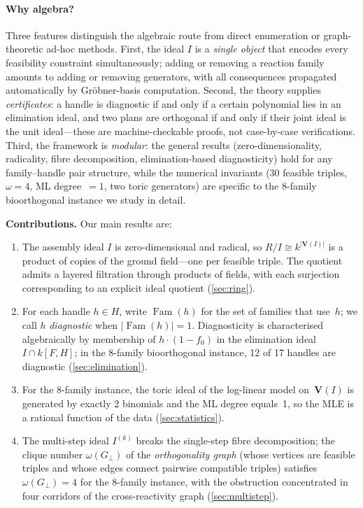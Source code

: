 \documentclass[preprint,12pt]{elsarticle}
\theoremstyle{definition}
\theoremstyle{remark}
\newcommand{\kk}{k}
\newcommand{\Var}{\mathbf{V}}
\DeclareMathOperator{\Fam}{Fam}
\begin{document}
\paragraph{Why algebra?}
Three features distinguish the algebraic route from direct
enumeration or graph-theoretic ad-hoc methods.
First, the ideal $I$ is a \emph{single object} that encodes every
feasibility constraint simultaneously; adding or removing a reaction
family amounts to adding or removing generators, with all consequences
propagated automatically by Gr\"obner-basis computation.
Second, the theory supplies \emph{certificates}: a handle is
diagnostic if and only if a certain polynomial lies in an elimination
ideal, and two plans are orthogonal if and only if their joint
ideal is the unit ideal---these are machine-checkable proofs, not
case-by-case verifications.
Third, the framework is \emph{modular}: the general results
(zero-dimensionality, radicality, fibre decomposition,
elimination-based diagnosticity) hold for any family--handle pair
structure, while the numerical invariants (30 feasible triples,
$\omega = 4$, ML degree~$= 1$, two toric generators) are specific
to the 8-family bioorthogonal instance we study in detail.

\medskip
\noindent\textbf{Contributions.}
Our main results are:

\begin{enumerate}[label=(\roman*),nosep]
\item The assembly ideal $I$ is zero-dimensional and radical, so
  $R/I \cong \kk^{|\Var(I)|}$ is a product of copies of the ground
  field---one per feasible triple.  The quotient admits a layered
  filtration through products of fields, with each surjection
  corresponding to an explicit ideal quotient (\cref{sec:ring}).
\item For each handle $h \in H$, write $\Fam(h)$ for the set of
  families that use~$h$; we call $h$ \emph{diagnostic} when
  $|\Fam(h)| = 1$.  Diagnosticity is characterised algebraically
  by membership of $h \cdot (1 - f_0)$ in the elimination ideal
  $I \cap \kk[F, H]$; in the 8-family bioorthogonal instance,
  12 of 17 handles are diagnostic (\cref{sec:elimination}).
\item For the 8-family instance, the toric ideal of the log-linear
  model on~$\Var(I)$ is generated by exactly 2 binomials and the
  ML degree equals~1, so the MLE is a rational function of the data
  (\cref{sec:statistics}).
\item The multi-step ideal $I^{(k)}$ breaks the single-step fibre
  decomposition; the clique number $\omega(G_\perp)$ of the
  \emph{orthogonality graph} (whose vertices are feasible triples
  and whose edges connect pairwise compatible triples) satisfies
  $\omega(G_\perp) = 4$ for the 8-family instance, with the
  obstruction concentrated in four corridors of the
  cross-reactivity graph (\cref{sec:multistep}).
\end{enumerate}
\end{document}
